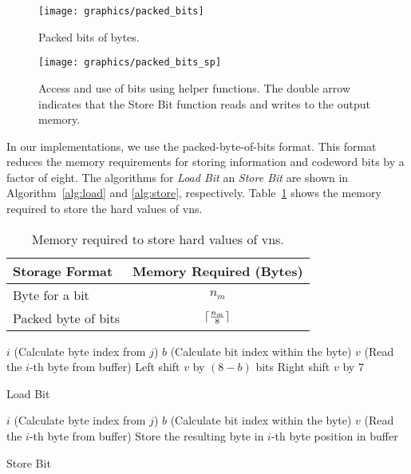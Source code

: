 \begin{enumerate}
  \begin{figure}[htbp]
    \centering
    \texttt{[image: graphics/packed\_bits]}
    \caption[Illustration of Packed-byte-of-bits storage format.]{Packed bits of bytes.}
    \label{fig:packed_bits}
  \end{figure}
  \begin{figure}[htbp]
    \centering
    \texttt{[image: graphics/packed\_bits\_sp]}
    \caption[Usage of bits stored in Packed-byte-of-bits format.]{Access and use of bits using helper functions. The double arrow indicates that the Store Bit function reads and writes to the output memory.}
    \label{fig:packed_spb}
  \end{figure}
\end{enumerate}
In our implementations, we use the packed-byte-of-bits format. This format reduces the memory requirements for storing information and codeword bits by a factor of eight. The algorithms for \emph{Load Bit} an \emph{Store Bit} are shown in Algorithm~\ref{alg:load} and \ref{alg:store}, respectively. Table~\ref{tab:mem_req} shows the memory required to store the hard values of \glspl{vn}.
\begin{table}[htbp]
  \centering
  \begin{tabular}{|l|c|}
    \hline
    \textbf{Storage Format} &\textbf{Memory Required (Bytes)}\\
    \hline
    \hline
    Byte for a bit &$n_m$\\
    \hline
    Packed byte of bits &$\lceil\frac{n_m}{8}\rceil$\\
    \hline
  \end{tabular}
  \caption{Memory required to store hard values of \glspl{vn}.}
  \label{tab:mem_req}
\end{table}

\begin{algorithm}[H]
  $i$ (Calculate byte index from $j$)\;
  $b$ (Calculate bit index within the byte)\;
  $v$ (Read the $i$-th byte from buffer)\;
  Left shift $v$ by $(8-b)$ bits\;
  Right shift $v$ by $7$\;
  \caption{Load Bit}
  \label{alg:load}
\end{algorithm}

\begin{algorithm}[H]
  $i$ (Calculate byte index from $j$)\;
  $b$ (Calculate bit index within the byte)\;
  $v$ (Read the $i$-th byte from buffer)\;
  Store the resulting byte in $i$-th byte position in buffer\;
  \caption{Store Bit}
  \label{alg:store}
\end{algorithm}

